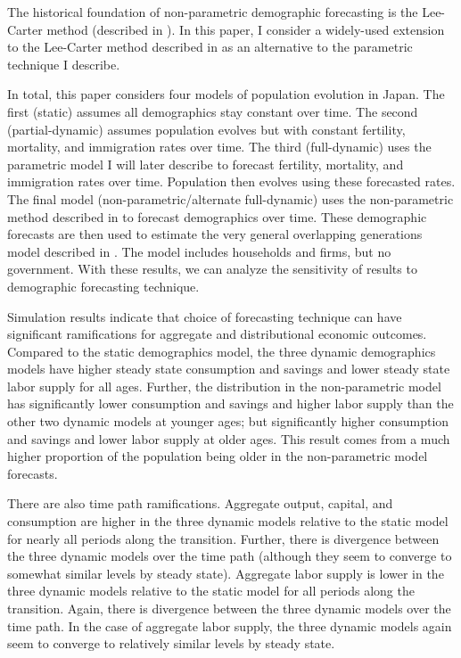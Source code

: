 \documentclass[10pt]{article}
\numberwithin{equation}{subsection}
\begin{document}
\par The historical foundation of non-parametric demographic forecasting is the Lee-Carter method (described in \cite{GK2007}). In this paper, I consider a widely-used extension to the Lee-Carter method described in \cite{alt_demo_paper} as an alternative to the parametric technique I describe.

\par In total, this paper considers four models of population evolution in Japan. The first (static) assumes all demographics stay constant over time. The second (partial-dynamic) assumes population evolves but with constant fertility, mortality, and immigration rates over time. The third (full-dynamic) uses the parametric model I will later describe to forecast fertility, mortality, and immigration rates over time. Population then evolves using these forecasted rates. The final model (non-parametric/alternate full-dynamic) uses the non-parametric method described in \cite{alt_demo_paper} to forecast demographics over time. These demographic forecasts are then used to estimate the very general overlapping generations model described in \cite{E2020}. The model includes households and firms, but no government. With these results, we can analyze the sensitivity of results to demographic forecasting technique.

\par Simulation results indicate that choice of forecasting technique can have significant ramifications for aggregate and distributional economic outcomes. Compared to the static demographics model, the three dynamic demographics models have higher steady state consumption and savings and lower steady state labor supply for all ages. Further, the distribution in the non-parametric model has significantly lower consumption and savings and higher labor supply than the other two dynamic models at younger ages; but significantly higher consumption and savings and lower labor supply at older ages. This result comes from a much higher proportion of the population being older in the non-parametric model forecasts.

\par There are also time path ramifications. Aggregate output, capital, and consumption are higher in the three dynamic models relative to the static model for nearly all periods along the transition. Further, there is divergence between the three dynamic models over the time path (although they seem to converge to somewhat similar levels by steady state). Aggregate labor supply is lower in the three dynamic models relative to the static model for all periods along the transition. Again, there is divergence between the three dynamic models over the time path. In the case of aggregate labor supply, the three dynamic models again seem to converge to relatively similar levels by steady state.
\end{document}
